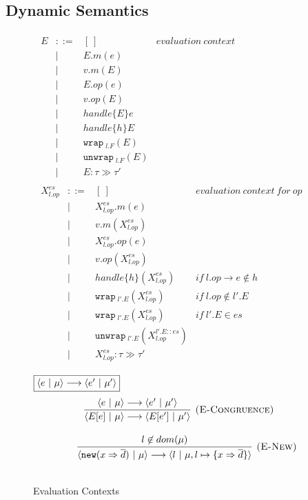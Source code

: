 \documentclass{article}
\newcommand{\keywadj}[1]{\mathtt{#1}}
\newcommand{\keyw}[1]{\keywadj{#1}~}
\begin{document}
\subsection{Dynamic Semantics}
\label{sec-dynamic}
\begin{figure}[H]
\flushleft



\footnotesize{

\[
\begin{array}{lll}
\begin{array}{lllr}
E & ::= & [~] & \mathit{evaluation~context}\\
  & |   & E.m(e)\\
	  & |   & v.m(E)\\
	  & |   & E.op(e)\\
	  & |   &  v.op(E)\\
  & |   & handle\{E\}e \\

  & |   & handle\{h\}E \\
  & | & \keyw{wrap}_{l.F}(E)\\
  & | & \keyw{unwrap}_{l.F}(E)\\
  & | & E : \tau \gg \tau'  \\
\end{array}
\begin{array}{lllr}

X^{es}_{l.op} & ::= &[~] & \mathit{evaluation~context~for~op}\\
  & |  &  X^{es}_{l.op}.m(e)\\
  & | &  v.m(X^{es}_{l.op})\\
    & |  &  X^{es}_{l.op}.op(e)\\
  & | &  v.op(X^{es}_{l.op})\\
  & | & handle\{h\} (X^{es}_{l.op}) &\mathit{if~l.op \rightarrow e \not\in h}\\
   & | & \keyw{wrap}_{l'.E}(X^{es}_{l.op})  &\mathit{if~l.op \not\in l'.E}\\
  & | & \keyw{wrap}_{l'.E}(X^{es}_{l.op})   &\mathit{if~l'.E \in es}  \\

  & | & \keyw{unwrap}_{l'.E}(X^{l'.E::es}_{l.op}) \\
   & | & X^{es}_{l.op} : \tau \gg \tau' 

\
\end{array}
\end{array}
\]


\caption{Evaluation Contexts}

$\fbox{$\langle e~|~\mu \rangle \longrightarrow \langle e'~|~\mu' \rangle$}$
\[
\begin{array}{c}
\infer[\textsc{(E-Congruence)}]
  {\langle E[e]~|~\mu \rangle \longrightarrow \langle E[e']~|~\mu' \rangle}
  {\langle e~|~\mu \rangle \longrightarrow \langle e'~|~\mu' \rangle} \\[3ex]
~~~~~
\infer[\textsc{(E-New)}]
  {\langle \keywadj{new} (x \Rightarrow \overline{d})~|~\mu \rangle \longrightarrow \langle l~|~\mu, l \mapsto \{ x \Rightarrow \overline{d} \} \rangle}
  {l \not\in dom(\mu)}\\[3ex]



\end{array}\]}
\end{figure}
\end{document}

